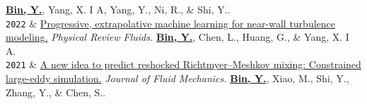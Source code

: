 \documentclass[12pt,letter]{article}
\newcommand{\LastName}{Bin}
\newcommand{\Initials}{Y.}
\newcommand{\Me}{\underline{\textbf{\LastName, \Initials}}}  %
\newcommand{\Xiang}{Yang, X. I A}
\newcommand{\Shi}{Shi, Y.}
\newcommand{\Geogre}{Huang, G.}
\newcommand{\Nirui}{Ni, R.}
\newcommand{\Lihua}{Chen, L.}
\newcommand{\Mengjuan}{Xiao, M.}
\newcommand{\Yousheng}{Zhang, Y.}
\newcommand{\Shiyi}{Chen, S.}
\newcommand{\Yantao}{Yang, Y.}
\newcommand{\Year}[1]{\fontsize{12pt}{0}\selectfont \texttt{#1}}
\newcommand{\DOI}[1]{DOI: \href{https://doi.org/#1}{#1}}
\begin{document}
\begin{EntriesTableYear}
  \newline
  \Me, \Xiang, \Yantao, \Nirui, \& \Shi.
\\
\Year{2022}  &
  \href{https://doi.org/10.1103/PhysRevFluids.7.084610}{Progressive, extrapolative machine learning for near-wall turbulence modeling.}
  \newline
  \textit{Physical Review Fluids.}
  \newline
  \Me, \Lihua, \Geogre, \& \Xiang.
\\
\Year{2021}  &
  \href{https://doi.org/10.1017/jfm.2021.332}{A new idea to predict reshocked Richtmyer–Meshkov mixing: Constrained large-eddy simulation.}
  \newline
  \textit{Journal of Fluid Mechanics.}
  \newline
  \Me, \Mengjuan, \Shi, \Yousheng, \& \Shiyi.
\end{EntriesTableYear}
\end{document}
